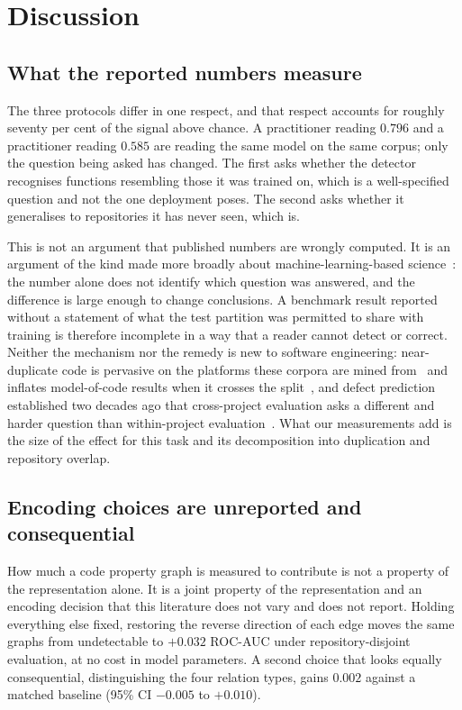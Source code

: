 \section{Discussion}
\label{sec:discussion}

\subsection{What the reported numbers measure}
The three protocols differ in one respect, and that respect accounts for roughly
seventy per cent of the signal above chance. A practitioner reading $0.796$ and
a practitioner reading $0.585$ are reading the same model on the same corpus;
only the question being asked has changed. The first asks whether the detector
recognises functions resembling those it was trained on, which is a
well-specified question and not the one deployment poses. The second asks
whether it generalises to repositories it has never seen, which is.

This is not an argument that published numbers are wrongly computed. It is an
argument of the kind made more broadly about machine-learning-based
science~\citep{kapoor2023leakage}: the number alone does not identify which
question was answered, and the difference is large enough to change
conclusions. A benchmark
result reported without a statement of what the test partition was permitted to
share with training is therefore incomplete in a way that a reader cannot detect
or correct. Neither the mechanism nor the remedy is new to software engineering:
near-duplicate code is pervasive on the platforms these corpora are mined
from~\citep{lopes2017dejavu} and inflates model-of-code results when it crosses
the split~\citep{allamanis2019adverse}, and defect prediction established two
decades ago that cross-project evaluation asks a different and harder question
than within-project evaluation~\citep{zimmermann2009cross}. What our measurements
add is the size of the effect for this task and its decomposition into
duplication and repository overlap.

\subsection{Encoding choices are unreported and consequential}
How much a code property graph is measured to contribute is not a property of
the representation alone. It is a joint property of the representation and an
encoding decision that this literature does not vary and does not report.
Holding everything else fixed, restoring the reverse direction of each edge
moves the same graphs from undetectable to $+0.032$ ROC-AUC under
repository-disjoint evaluation, at no cost in model parameters. A second choice
that looks equally consequential, distinguishing the four relation types,
gains $0.002$ against a matched baseline (95\% CI $-0.005$ to $+0.010$).

